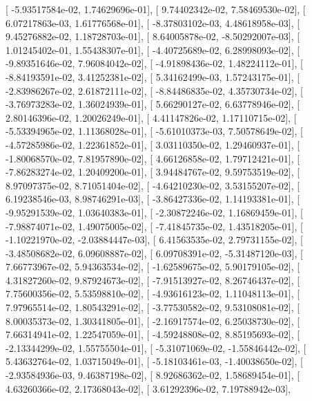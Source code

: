 \documentclass{article}
\begin{document}
       [ -5.93517584e-02,   1.74629696e-01],
       [  9.74402342e-02,   7.58469530e-02],
       [  6.07217863e-03,   1.61776568e-01],
       [ -8.37803102e-03,   4.48618958e-03],
       [  9.45276882e-02,   1.18728703e-01],
       [  8.64005878e-02,  -8.50292007e-03],
       [  1.01245402e-01,   1.55438307e-01],
       [ -4.40725689e-02,   6.28998093e-02],
       [ -9.89351646e-02,   7.96084042e-02],
       [ -4.91898436e-02,   1.48224112e-01],
       [ -8.84193591e-02,   3.41252381e-02],
       [  5.34162499e-03,   1.57243175e-01],
       [ -2.83986267e-02,   2.61872111e-02],
       [ -8.84486835e-02,   4.35730734e-02],
       [ -3.76973283e-02,   1.36024939e-01],
       [  5.66290127e-02,   6.63778946e-02],
       [  2.80146396e-02,   1.20026249e-01],
       [  4.41147826e-02,   1.17110715e-02],
       [ -5.53394965e-02,   1.11368028e-01],
       [ -5.61010373e-03,   7.50578649e-02],
       [ -4.57285986e-02,   1.22361852e-01],
       [  3.03110350e-02,   1.29460937e-01],
       [ -1.80068570e-02,   7.81957890e-02],
       [  4.66126858e-02,   1.79712421e-01],
       [ -7.86283274e-02,   1.20409200e-01],
       [  3.94484767e-02,   9.59753519e-02],
       [  8.97097375e-02,   8.71051404e-02],
       [ -4.64210230e-02,   3.53155207e-02],
       [  6.19238546e-03,   8.98746291e-03],
       [ -3.86427336e-02,   1.14193381e-01],
       [ -9.95291539e-02,   1.03640383e-01],
       [ -2.30872246e-02,   1.16869459e-01],
       [ -7.98874071e-02,   1.49075005e-02],
       [ -7.41845735e-02,   1.43518205e-01],
       [ -1.10221970e-02,  -2.03884447e-03],
       [  6.41563535e-02,   2.79731155e-02],
       [ -3.48508682e-02,   6.09608887e-02],
       [  6.09708391e-02,  -5.31487120e-03],
       [  7.66773967e-02,   5.94363534e-02],
       [ -1.62589675e-02,   5.90179105e-02],
       [  4.31827260e-02,   9.87924673e-02],
       [ -7.91513927e-02,   8.26746437e-02],
       [  7.75600356e-02,   5.53598810e-02],
       [ -4.93616123e-02,   1.11048113e-01],
       [  7.97965514e-02,   1.80543291e-02],
       [ -3.77530582e-02,   9.53108081e-02],
       [  8.00035373e-02,   1.30341805e-01],
       [ -2.16917574e-02,   6.25038730e-02],
       [  7.66314941e-02,   1.22547059e-01],
       [ -4.59248808e-02,   8.85195693e-02],
       [ -2.13344299e-02,   1.55755504e-01],
       [ -5.31071069e-02,  -1.55846442e-02],
       [  5.43632764e-02,   1.03715049e-01],
       [ -5.18103461e-03,  -1.40038650e-02],
       [ -2.93584936e-03,   9.46387198e-02],
       [  8.92686362e-02,   1.58689454e-01],
       [  4.63260366e-02,   2.17368043e-02],
       [  3.61292396e-02,   7.19788942e-03],
\end{document}
